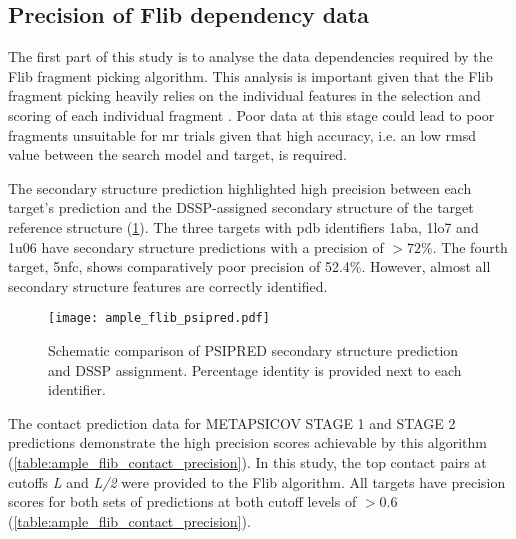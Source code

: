 \subsection{Precision of Flib dependency data}
The first part of this study is to analyse the data dependencies required by the Flib fragment picking algorithm. This analysis is important given that the Flib fragment picking heavily relies on the individual features in the selection and scoring of each individual fragment \cite{De_Oliveira2015-ba}. Poor data at this stage could lead to poor fragments unsuitable for \gls{mr} trials given that high accuracy, i.e. an low \gls{rmsd} value between the search model and target, is required.

The secondary structure prediction highlighted high precision between each target's prediction and the DSSP-assigned \cite{Frishman1995-ns} secondary structure of the target reference structure (\cref{fig:ample_flib_psipred}). The three targets with \gls{pdb} identifiers 1aba, 1lo7 and 1u06 have secondary structure predictions with a precision of $>72$\%. The fourth target, 5nfc, shows comparatively poor precision of 52.4\%. However, almost all secondary structure features are correctly identified.

\begin{figure}[H]
	\centering
	\texttt{[image: ample\_flib\_psipred.pdf]}
	\caption[PSIPRED schema for Flib targets]{Schematic comparison of PSIPRED \cite{Jones1999-fi} secondary structure prediction and DSSP \cite{Frishman1995-ns} assignment. Percentage identity is provided next to each identifier.}
	\label{fig:ample_flib_psipred}
\end{figure}

The contact prediction data for METAPSICOV STAGE 1 and STAGE 2 predictions demonstrate the high precision scores achievable by this algorithm (\cref{table:ample_flib_contact_precision}). In this study, the top contact pairs at cutoffs \textit{L} and \textit{L/2} were provided to the Flib algorithm. All targets have precision scores for both sets of predictions at both cutoff levels of $>0.6$ (\cref{table:ample_flib_contact_precision}).

